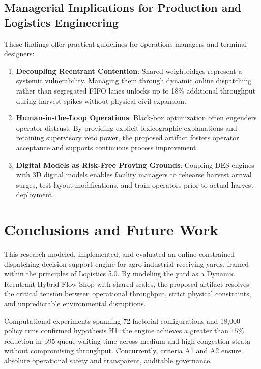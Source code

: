 \documentclass[12pt,a4paper]{article}
\begin{document}
\subsection{Managerial Implications for Production and Logistics Engineering}
These findings offer practical guidelines for operations managers and terminal designers:
\begin{enumerate}[leftmargin=1.2cm,itemsep=0pt,topsep=2pt]
  \item \textbf{Decoupling Reentrant Contention}: Shared weighbridges represent a systemic vulnerability. Managing them through dynamic online dispatching rather than segregated FIFO lanes unlocks up to 18\% additional throughput during harvest spikes without physical civil expansion.
  \item \textbf{Human-in-the-Loop Operations}: Black-box optimization often engenders operator distrust. By providing explicit lexicographic explanations and retaining supervisory veto power, the proposed artifact fosters operator acceptance and supports continuous process improvement.
  \item \textbf{Digital Models as Risk-Free Proving Grounds}: Coupling DES engines with 3D digital models enables facility managers to rehearse harvest arrival surges, test layout modifications, and train operators prior to actual harvest deployment.
\end{enumerate}

\section{Conclusions and Future Work}
\label{sec:conclusion}

This research modeled, implemented, and evaluated an online constrained dispatching decision-support engine for agro-industrial receiving yards, framed within the principles of Logistics 5.0. By modeling the yard as a Dynamic Reentrant Hybrid Flow Shop with shared scales, the proposed artifact resolves the critical tension between operational throughput, strict physical constraints, and unpredictable environmental disruptions.

Computational experiments spanning 72 factorial configurations and 18,000 policy runs confirmed hypothesis H1: the engine achieves a greater than $15\%$ reduction in p95 queue waiting time across medium and high congestion strata without compromising throughput. Concurrently, criteria A1 and A2 ensure absolute operational safety and transparent, auditable governance.
\end{document}
